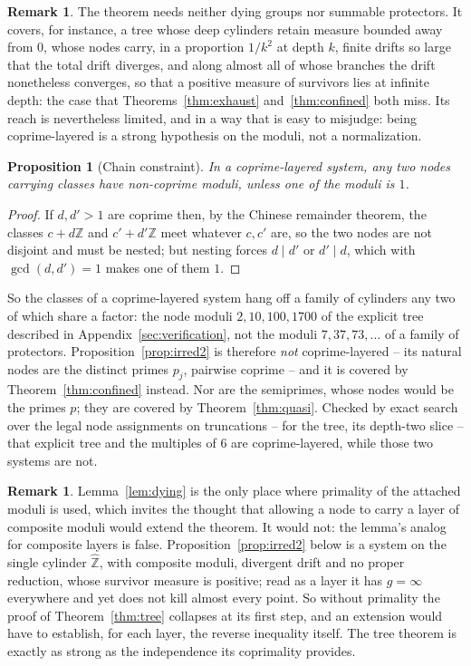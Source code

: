 \documentclass[11pt]{article}
\theoremstyle{plain}
\newtheorem{proposition}[theorem]{Proposition}
\theoremstyle{definition}
\newtheorem{remark}[theorem]{Remark}
\newcommand{\Zhat}{\widehat{\mathbb{Z}}}
\begin{document}
\begin{remark}
The theorem needs neither dying groups nor summable protectors.
It covers, for instance, a tree whose deep cylinders retain
measure bounded away from $0$, whose nodes carry, in a
proportion $1/k^2$ at depth $k$, finite drifts so large that the
total drift diverges, and along almost all of whose branches the
drift nonetheless converges, so that a positive measure of
survivors lies at infinite depth: the case that
Theorems~\ref{thm:exhaust} and~\ref{thm:confined} both miss.
Its reach is nevertheless limited, and in a way that is easy to
misjudge: being coprime-layered is a strong hypothesis on the
moduli, not a normalization.

\begin{proposition}[Chain constraint]\label{prop:chain}
In a coprime-layered system, any two nodes carrying classes have
non-coprime moduli, unless one of the moduli is $1$.
\end{proposition}

\begin{proof}
If $d,d'>1$ are coprime then, by the Chinese remainder theorem,
the classes $c+d\mathbb{Z}$ and $c'+d'\mathbb{Z}$ meet whatever
$c,c'$ are, so the two nodes are not disjoint and must be
nested; but nesting forces $d\mid d'$ or $d'\mid d$, which with
$\gcd(d,d')=1$ makes one of them $1$.
\end{proof}

So the classes of a coprime-layered system hang off a family of
cylinders any two of which share a factor: the node moduli
$2,10,100,1700$ of the explicit tree described in
Appendix~\ref{sec:verification}, not the moduli $7,37,73,\dots$
of a family of protectors.
Proposition~\ref{prop:irred2} is therefore \emph{not}
coprime-layered -- its natural nodes are the distinct primes
$p_j$, pairwise coprime -- and it is covered by
Theorem~\ref{thm:confined} instead.  Nor are the
semiprimes, whose nodes would be the primes $p$; they are
covered by Theorem~\ref{thm:quasi}.  Checked by exact search
over the legal node assignments on truncations -- for the tree,
its depth-two slice -- that explicit tree and the multiples of
$6$ are coprime-layered, while those two systems are not.
\end{remark}

\begin{remark}\label{rem:circular}
Lemma~\ref{lem:dying} is the only place where primality of the
attached moduli is used, which invites the thought that allowing
a node to carry a layer of composite moduli would extend the
theorem.  It would not: the lemma's analog for composite layers
is false.  Proposition~\ref{prop:irred2} below is a system on the
single cylinder $\Zhat$, with composite moduli, divergent
drift and no proper reduction, whose survivor measure is
positive; read as a layer it has $g=\infty$ everywhere and yet
does not kill almost every point.  So without primality the
proof of Theorem~\ref{thm:tree} collapses at its first step, and
an extension would have to establish, for each layer, the
reverse inequality itself.  The tree theorem is exactly as
strong as the independence its coprimality provides.
\end{remark}
\end{document}
